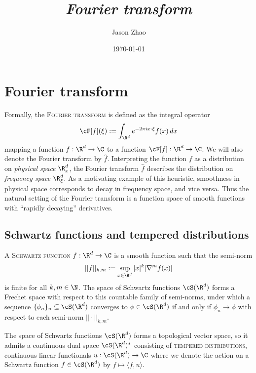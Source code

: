 \documentclass[reqno]{amsart}
\title
{
	\emph{Fourier transform}
}
\author{Jason Zhao}
\date{\today}
\theoremstyle{definition}
\theoremstyle{remark}
\renewcommand{\emph}{\textsc}
\begin{document}
\maketitle

\tableofcontents

\section{Fourier transform}

Formally, the \emph{Fourier transform} is defined as the integral operator
	\[ \cF [f] (\xi) := \int_{\R^d} e^{-2\pi i x \cdot \xi} f(x) \, dx \]
mapping a function $f : \R^d \to \C$ to a function $\cF [f] : \R^d \to \C$. We will also denote the Fourier transform by $\widehat f$. Interpreting the function $f$ as a distribution on \textit{physical space} $\R^d_x$, the Fourier transform $\widehat f$ describes the distribution on \textit{frequency space} $\R^d_\xi$. As a motivating example of this heuristic, smoothness in physical space corresponds to decay in frequency space, and vice versa. Thus the natural setting of the Fourier transform is a function space of smooth functions with ``rapidly decaying'' derivatives. 

\subsection{Schwartz functions and tempered distributions}

A \emph{Schwartz function} $f: \R^d \to \C$ is a smooth function such that the semi-norm
	\[ ||f||_{k, m} := \sup_{x \in \R^d} |x|^k | \nabla^m f (x)| \]
is finite for all $k, m \in \N$. The space of Schwartz functions $\cS (\R^d)$ forms a Frechet space with respect to this countable family of semi-norms, under which a sequence $\{\phi_n\}_n \subseteq \cS (\R^d)$ converges to $\phi \in \cS (\R^d)$ if and only if $\phi_n \to \phi$ with respect to each semi-norm $|| \cdot ||_{k, m}$. 

The space of Schwartz functions $\cS (\R^d)$ forms a topological vector space, so it admits a continuous dual space $\cS (\R^d)^*$ consisting of \emph{tempered distributions}, continuous linear functionals $u : \cS (\R^d) \to \C$ where we denote the action on a Schwartz function $f \in \cS (\R^d)$ by $f \mapsto \langle f , u \rangle$. 
\end{document}
